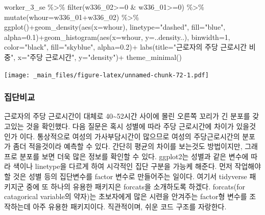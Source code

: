 \documentclass[
]{book}
\newenvironment{Shaded}{\begin{snugshade}}{\end{snugshade}}
\newcommand{\AttributeTok}[1]{\textcolor[rgb]{0.77,0.63,0.00}{#1}}
\newcommand{\DecValTok}[1]{\textcolor[rgb]{0.00,0.00,0.81}{#1}}
\newcommand{\FloatTok}[1]{\textcolor[rgb]{0.00,0.00,0.81}{#1}}
\newcommand{\FunctionTok}[1]{\textcolor[rgb]{0.00,0.00,0.00}{#1}}
\newcommand{\NormalTok}[1]{#1}
\newcommand{\SpecialCharTok}[1]{\textcolor[rgb]{0.00,0.00,0.00}{#1}}
\newcommand{\StringTok}[1]{\textcolor[rgb]{0.31,0.60,0.02}{#1}}
\theoremstyle{definition}
\theoremstyle{definition}
\theoremstyle{definition}
\theoremstyle{definition}
\theoremstyle{remark}
\begin{document}
\begin{Shaded}
\begin{Highlighting}[]
\NormalTok{worker\_3\_se }\SpecialCharTok{\%\textgreater{}\%} 
  \FunctionTok{filter}\NormalTok{(w336\_02}\SpecialCharTok{\textgreater{}=}\DecValTok{0} \SpecialCharTok{\&}\NormalTok{ w336\_01}\SpecialCharTok{\textgreater{}=}\DecValTok{0}\NormalTok{) }\SpecialCharTok{\%\textgreater{}\%} 
  \FunctionTok{mutate}\NormalTok{(}\AttributeTok{whour=}\NormalTok{w336\_01}\SpecialCharTok{+}\NormalTok{w336\_02) }\SpecialCharTok{\%\textgreater{}\%} 
  \FunctionTok{ggplot}\NormalTok{()}\SpecialCharTok{+}\FunctionTok{geom\_density}\NormalTok{(}\FunctionTok{aes}\NormalTok{(}\AttributeTok{x=}\NormalTok{whour), }\AttributeTok{linetype=}\StringTok{"dashed"}\NormalTok{, }\AttributeTok{fill=}\StringTok{"blue"}\NormalTok{, }\AttributeTok{alpha=}\FloatTok{0.1}\NormalTok{)}\SpecialCharTok{+}\FunctionTok{geom\_histogram}\NormalTok{(}\FunctionTok{aes}\NormalTok{(}\AttributeTok{x=}\NormalTok{whour, }\AttributeTok{y=}\NormalTok{..density..), }\AttributeTok{binwidth=}\DecValTok{1}\NormalTok{, }\AttributeTok{color=}\StringTok{"black"}\NormalTok{, }\AttributeTok{fill=}\StringTok{"skyblue"}\NormalTok{, }\AttributeTok{alpha=}\FloatTok{0.2}\NormalTok{)}\SpecialCharTok{+}
  \FunctionTok{labs}\NormalTok{(}\AttributeTok{title=}\StringTok{"근로자의 주당 근로시간 비중"}\NormalTok{, }\AttributeTok{x=}\StringTok{"주당 근로시간"}\NormalTok{, }\AttributeTok{y=}\StringTok{"density"}\NormalTok{)}\SpecialCharTok{+}
  \FunctionTok{theme\_minimal}\NormalTok{()}
\end{Highlighting}
\end{Shaded}

\texttt{[image: \_main\_files/figure-latex/unnamed-chunk-72-1.pdf]}

\hypertarget{uxc9d1uxb2e8uxbe44uxad50}{%
\subsubsection{집단비교}\label{uxc9d1uxb2e8uxbe44uxad50}}

근로자의 주당 근로시간이 대체로 40\textasciitilde52시간 사이에 몰린 오른쪽 꼬리가 긴 분포를 갖고있는 것을 확인했다. 다음 질문은 혹시 성별에 따라 주당 근로시간에 차이가 있을것인가 이다. 통상적으로 여성의 가사부담시간이 많으므로 여성의 주당근로시간의 분포가 좀더 적을것이라 예측할 수 있다. 간단히 평균의 차이를 보는것도 방법이지만, 그래프로 분포를 보면 더욱 많은 정보를 확인할 수 있다.
ggplot2는 성별과 같은 변수에 따라 색이나 linetype을 다르게 하여 시각적인 집단 구분을 가능케 해준다. 먼저 작업해야 할 것은 성별 등의 집단변수를 factor 변수로 만들어주는 일이다. 여기서 tidyverse 패키지군 중에 또 하나의 유용한 패키지은 forcats을 소개하도록 하겠다. forcats(for catagorical variable의 약자)는 초보자에게 많은 시련을 안겨주는 factor형 변수를 조작하는데 아주 유용한 패키지이다. 직관적이며, 쉬운 코드 구조를 자랑한다.
\end{document}

